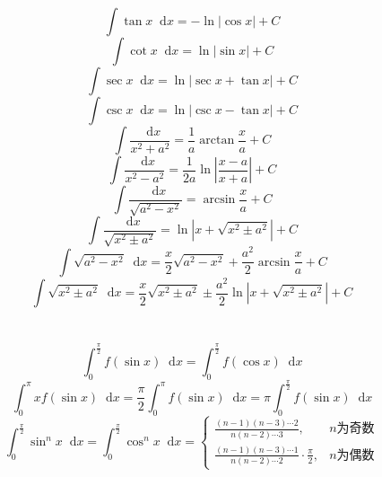 \documentclass[]{article}
\newcommand*{\dif}{\mathop{}\!\mathrm{d}}
\numberwithin{equation}{section}
\begin{document}
\section{}
\begin{equation}
    \int\tan x\dif x=-\ln\left|\cos x\right|+C
\end{equation}
\begin{equation}
    \int\cot x\dif x=\ln\left|\sin x\right|+C
\end{equation}
\begin{equation}
    \int\sec x\dif x=\ln\left|\sec x+\tan x\right|+C
\end{equation}
\begin{equation}
    \int\csc x\dif x=\ln\left|\csc x-\tan x\right|+C
\end{equation}
\begin{equation}
    \int\frac{\dif x}{x^2+a^2}=\frac{1}{a}\arctan\frac{x}{a}+C
\end{equation}
\begin{equation}
    \int\frac{\dif x}{x^2-a^2}=\frac{1}{2a}\ln\left|\frac{x-a}{x+a}\right|+C
\end{equation}
\begin{equation}
    \int\frac{\dif x}{\sqrt{a^2-x^2}}=\arcsin\frac{x}{a}+C
\end{equation}
\begin{equation}
    \int\frac{\dif x}{\sqrt{x^2\pm a^2}}=\ln\left|x+\sqrt{x^2\pm a^2}\right|+C
\end{equation}
\begin{equation}
    \int\sqrt{a^2-x^2}\dif x=\frac{x}{2}\sqrt{a^2-x^2}+\frac{a^2}{2}\arcsin\frac{x}{a}+C
\end{equation}
\begin{equation}
    \int\sqrt{x^2\pm a^2}\dif x=\frac{x}{2}\sqrt{x^2\pm a^2}\pm\frac{a^2}{2}\ln\left|x+\sqrt{x^2\pm a^2}\right|+C
\end{equation}

\section{}
\begin{equation}
    \int_0^\frac{\pi}{2}f(\sin x)\dif x=\int_0^\frac{\pi}{2}f(\cos x)\dif x
\end{equation}
\begin{equation}
    \int_0^\pi xf(\sin x)\dif x=\frac{\pi}{2}\int_0^\pi f(\sin x)\dif x=\pi\int_0^\frac{\pi}{2}f(\sin x)\dif x
\end{equation}
\begin{equation}
    \int_0^\frac{\pi}{2}\sin^n x\dif x=\int_0^\frac{\pi}{2}\cos^n x\dif x=
    \begin{cases}
        \frac{(n-1)(n-3)\cdots2}{n(n-2)\cdots3},                   & n\text{为奇数} \\
        \frac{(n-1)(n-3)\cdots1}{n(n-2)\cdots2}\cdot\frac{\pi}{2}, & n\text{为偶数}
    \end{cases}
\end{equation}
\end{document}
